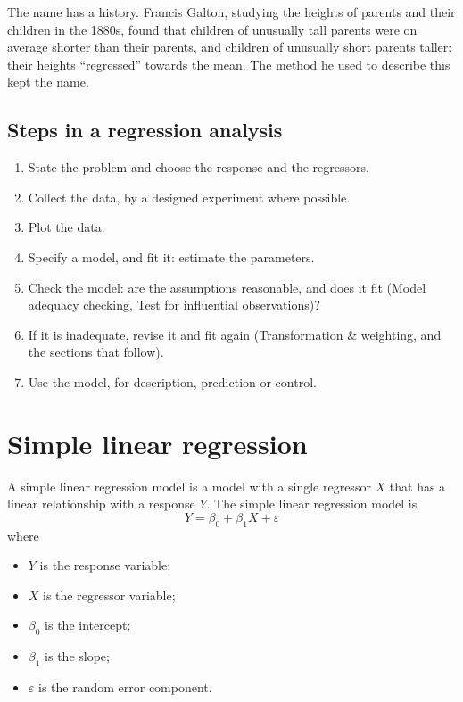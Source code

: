 \documentclass[11pt,a4paper]{article}
\numberwithin{equation}{section}
\theoremstyle{definition}
\begin{document}
The name has a history. Francis Galton, studying the heights of parents and their children
in the 1880s, found that children of unusually tall parents were on average shorter than
their parents, and children of unusually short parents taller: their heights
``regressed'' towards the mean. The method he used to describe this kept the name.

\subsection{Steps in a regression analysis}
\begin{enumerate}
\item State the problem and choose the response and the regressors.
\item Collect the data, by a designed experiment where possible.
\item Plot the data.
\item Specify a model, and fit it: estimate the parameters.
\item Check the model: are the assumptions reasonable, and does it fit
(Model adequacy checking, Test for influential observations)?
\item If it is inadequate, revise it and fit again (Transformation \& weighting, and the
sections that follow).
\item Use the model, for description, prediction or control.
\end{enumerate}













\section{Simple linear regression}
A simple linear regression model is a model with a single regressor $X$ that has a linear relationship with a response $Y$. The simple linear regression model is 
\begin{equation}
Y = \beta_0 + \beta_1X + \varepsilon
\end{equation}
where
\begin{itemize}
\item $Y$ is the response variable;
\item $X$ is the regressor variable;
\item $\beta_0$ is the intercept;
\item $\beta_1$ is the slope;
\item $\varepsilon$ is the random error component.
\end{itemize}
\end{document}
